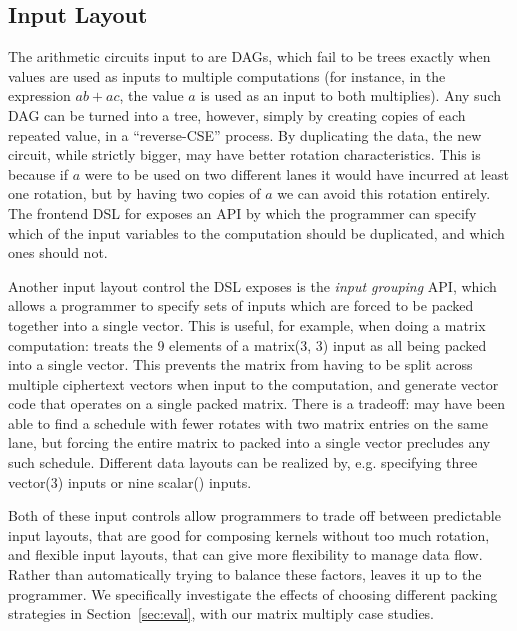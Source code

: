 \subsection{Input Layout}\label{sec:duplicating-inputs}
The arithmetic circuits input to \system are DAGs, which fail to be trees exactly when values are used as inputs to multiple computations (for instance, in the expression $ab + ac$, the value $a$ is used as an input to both multiplies).
Any such DAG can be turned into a tree, however, simply by creating copies of each repeated value, in a ``reverse-CSE'' process.
By duplicating the data, the new circuit, while strictly bigger, may have better rotation characteristics.
This is because if $a$ were to be used on two different lanes it would have incurred at least one rotation, but by having two copies of $a$ we can avoid this rotation entirely. The frontend DSL for \system exposes an API by which the programmer can specify which of the input variables to the computation should be duplicated, and which ones should not.

Another input layout control the \system DSL exposes is the {\em input grouping} API, which allows a programmer to specify sets of inputs which are forced to be packed together into a single vector.
This is useful, for example, when doing a matrix computation: \system treats the 9 elements of a {\sf matrix(3, 3)} input as all being packed into a single vector.
This prevents the matrix from having to be split across multiple ciphertext vectors when input to the computation, and generate vector code that operates on a single packed matrix.
There is a tradeoff: \system may have been able to find a schedule with fewer rotates with two matrix entries on the same lane, but forcing the entire matrix to packed into a single vector precludes any such schedule.
Different data layouts can be realized by, e.g. specifying three {\sf vector(3)} inputs or nine {\sf scalar()} inputs.

Both of these input controls allow programmers to trade off between predictable input layouts, that are good for composing kernels without too much rotation, and flexible input layouts, that can give \system more flexibility to manage data flow. Rather than automatically trying to balance these factors, \system leaves it up to the programmer.
We specifically investigate the effects of choosing different packing strategies in Section~\ref{sec:eval}, with our matrix multiply case studies.

